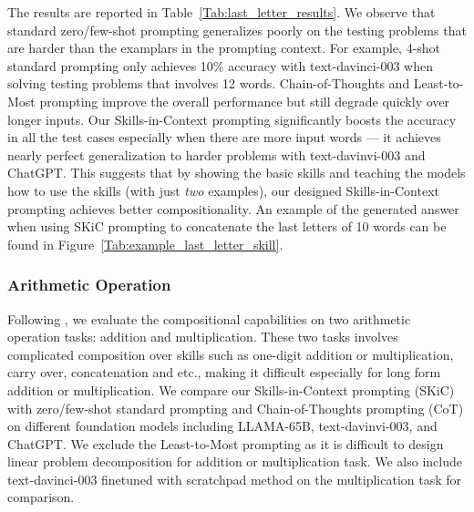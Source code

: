 \documentclass{article} \usepackage{arxiv}
\begin{document}
The results are reported in Table~\ref{Tab:last_letter_results}. We observe that standard zero/few-shot prompting generalizes poorly on the testing problems that are harder than the examplars in the prompting context. For example, 4-shot standard prompting only achieves 10\% accuracy with text-davinci-003 when solving testing problems that involves 12 words. Chain-of-Thoughts and Least-to-Most prompting improve the overall performance but still degrade quickly over longer inputs. Our Skills-in-Context prompting  significantly boosts the accuracy in all the test cases especially when there are more input words --- it achieves nearly perfect generalization to harder problems with text-davinvi-003 and ChatGPT. This suggests that by showing the basic skills and teaching the models how to use the skills (with just \emph{two} examples), our designed Skills-in-Context prompting achieves better compositionality. An example of the generated answer when using SKiC prompting to concatenate the last letters of 10 words can be found in Figure~\ref{Tab:example_last_letter_skill}.



\subsubsection{Arithmetic Operation}
Following \citeauthor{dziri2023faith}, we evaluate the compositional capabilities on two arithmetic operation tasks: addition and multiplication. These two tasks involves complicated composition over skills such as one-digit addition or multiplication, carry over, concatenation and etc.\citep{dziri2023faith}, making it difficult especially for long form addition or multiplication. We compare our Skills-in-Context prompting (SKiC) with zero/few-shot standard prompting \citep{brown2020language} and Chain-of-Thoughts prompting (CoT) \citep{wei2022chain} on different foundation models including LLAMA-65B, text-davinvi-003, and ChatGPT. We exclude the Least-to-Most prompting \citep{zhou2022least} as it is difficult to design linear problem decomposition for addition or multiplication task. We also include text-davinci-003 finetuned with scratchpad method \citep{nye2021show,dziri2023faith} on the multiplication task for comparison.
\end{document}
